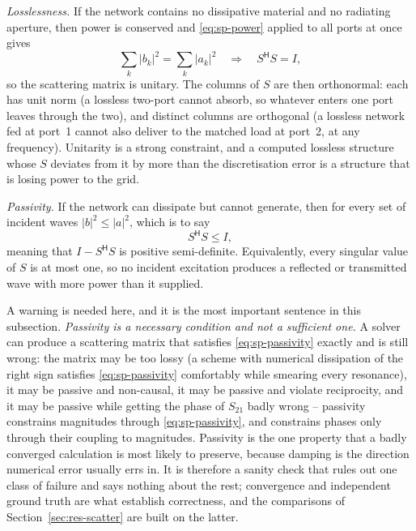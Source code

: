 \emph{Losslessness.} If the network contains no dissipative material and no radiating aperture, then power is
conserved and \eqref{eq:sp-power} applied to all ports at once gives
\begin{equation}
  \sum_{k}|b_k|^2 = \sum_{k}|a_k|^2
  \quad\Longrightarrow\quad
  S^{\mathsf{H}} S = I ,
  \label{eq:sp-lossless}
\end{equation}
so the scattering matrix is unitary. The columns of $S$ are then orthonormal: each has unit norm (a lossless
two-port cannot absorb, so whatever enters one port leaves through the two), and distinct columns are orthogonal
(a lossless network fed at port~1 cannot also deliver to the matched load at port~2, at any frequency). Unitarity
is a strong constraint, and a computed lossless structure whose $S$ deviates from it by more than the discretisation
error is a structure that is losing power to the grid.

\emph{Passivity.} If the network can dissipate but cannot generate, then for every set of incident waves
$|b|^2\le|a|^2$, which is to say
\begin{equation}
  S^{\mathsf{H}} S \le I ,
  \label{eq:sp-passivity}
\end{equation}
meaning that $I - S^{\mathsf{H}}S$ is positive semi-definite. Equivalently, every singular value of $S$ is at
most one, so no incident excitation produces a reflected or transmitted wave with more power than it supplied.

A warning is needed here, and it is the most important sentence in this subsection. \emph{Passivity is a
necessary condition and not a sufficient one.} A solver can produce a scattering matrix that satisfies
\eqref{eq:sp-passivity} exactly and is still wrong: the matrix may be too lossy (a scheme with numerical
dissipation of the right sign satisfies \eqref{eq:sp-passivity} comfortably while smearing every resonance), it
may be passive and non-causal, it may be passive and violate reciprocity, and it may be passive while getting the
phase of $S_{21}$ badly wrong -- passivity constrains magnitudes through \eqref{eq:sp-passivity}, and constrains
phases only through their coupling to magnitudes. Passivity is the one property that a badly converged
calculation is most likely to preserve, because damping is the direction numerical error usually errs in. It is
therefore a sanity check that rules out one class of failure and says nothing about the rest; convergence and
independent ground truth are what establish correctness, and the comparisons of Section~\ref{sec:res-scatter}
are built on the latter.

